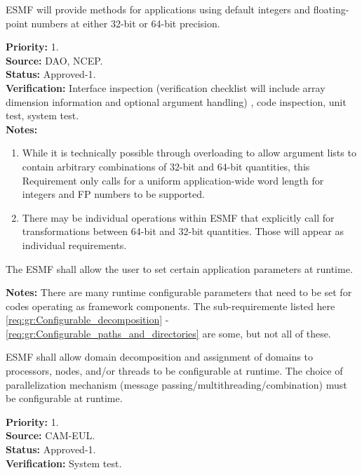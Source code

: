  ESMF will provide methods for applications using
default integers and floating-point numbers at either 32-bit or 64-bit
precision.

\begin{reqlist}
  {\bf Priority:} 1. \\
  {\bf Source:} DAO, NCEP. \\
  {\bf Status:} Approved-1. \\
  {\bf Verification:} Interface inspection (verification 
  checklist will include array dimension information and
  optional argument handling) , code inspection, unit
  test, system test. \\
  {\bf Notes:}
  \begin{enumerate}
  \item While it is technically possible through overloading to allow
    argument lists to contain arbitrary combinations of 32-bit and
    64-bit quantities, this Requirement only calls for a uniform
    application-wide word length for integers and FP numbers to be
    supported.
  \item There may be individual operations within ESMF that explicitly
    call for transformations between 64-bit and 32-bit quantities.
    Those will appear as individual requirements.
  \end{enumerate}
\end{reqlist}

 The ESMF shall allow the user to set
certain application parameters at runtime.
\begin{reqlist}
{\bf Notes:} There are many runtime configurable parameters that 
need to be set for codes operating as framework components.
The sub-requiremente listed here \ref{req:gr:Configurable_decomposition} - 
\ref{req:gr:Configurable_paths_and_directories} are some, but not all of these.
\end{reqlist}

 ESMF shall allow domain
decomposition and assignment of domains to processors, nodes, and/or
threads to be configurable at runtime.  The choice of parallelization
mechanism (message passing/multithreading/combination) must be
configurable at runtime.
\label{req:gr:Configurable_decomposition}
\begin{reqlist}
{\bf Priority:} 1. \\
{\bf Source:} CAM-EUL. \\
{\bf Status:} Approved-1. \\
{\bf Verification:} System test.
\end{reqlist}

